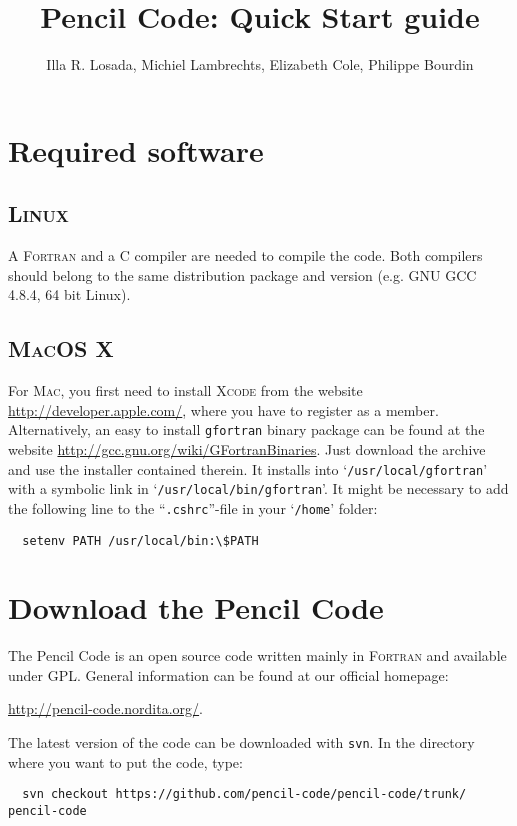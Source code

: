 \documentclass[a4paper,12pt]{article}
\title{Pencil Code: Quick Start guide}
\author{Illa R. Losada, Michiel Lambrechts, Elizabeth Cole, Philippe Bourdin}
\newcommand{\command}[1]{\texttt{#1}}
\newcommand{\file}[1]{``\texttt{#1}''}
\newcommand{\directory}[1]{`\texttt{#1}'}
\newcommand{\name}[1]{\textsc{#1}}
\begin{document}
\maketitle

\tableofcontents

\newpage


\section{Required software}

\subsection{\name{Linux}}
A \name{Fortran} and a \name{C} compiler are needed to compile the code.
Both compilers should belong to the same distribution package and version (e.g. GNU GCC 4.8.4, 64 bit Linux).

\subsection{\name{MacOS X}}
For \name{Mac}, you first need to install \name{Xcode} from the
website \url{http://developer.apple.com/}, where you have to register as a member.
Alternatively, an easy to install \command{gfortran} binary package can be found at the website \url{http://gcc.gnu.org/wiki/GFortranBinaries}. Just download the archive and use the installer contained therein.
It installs into \directory{/usr/local/gfortran} with
a symbolic link in \directory{/usr/local/bin/gfortran}. It might be necessary to add
the following line to the \file{.cshrc}-file in your \directory{/home} folder:
\begin{verbatim}
  setenv PATH /usr/local/bin:\$PATH
\end{verbatim}


\section{Download the Pencil Code}
The Pencil Code is an open source code written mainly in \name{Fortran} and available under GPL.
General information can be found at our official homepage:

\url{http://pencil-code.nordita.org/}.

The latest version of the code can be downloaded with \command{svn}. In the
directory where you want to put the code, type:
\begin{verbatim}
  svn checkout https://github.com/pencil-code/pencil-code/trunk/ pencil-code
\end{verbatim}
\end{document}
